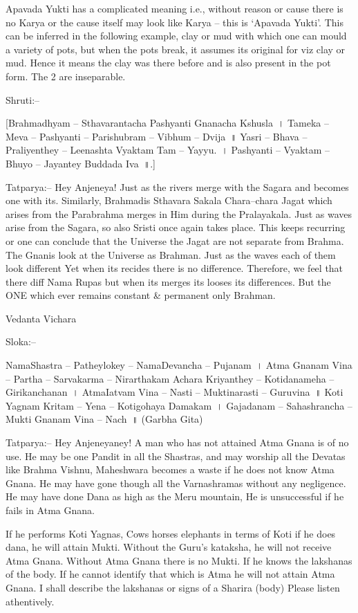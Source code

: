 Apavada Yukti has a complicated meaning i.e., without reason or cause there is no Karya or the cause itself may look like Karya – this is ‘Apavada Yukti’. This can be inferred in the following example, clay or mud with which one can mould a variety of pots, but when the pots break, it assumes its original for viz clay or mud. Hence it means the clay was there before and is also present in the pot form. The 2 are inseparable.

Shruti:–

[Brahmadhyam – Sthavarantacha Pashyanti Gnanacha Kshusla~। Tameka – Meva – Pashyanti – Parishubram – Vibhum – Dvija~॥ Yasri – Bhava – Praliyenthey – Leenashta Vyaktam Tam – Yayyu.~। Pashyanti – Vyaktam – Bhuyo – Jayantey Buddada Iva~॥.]

Tatparya:– Hey Anjeneya! Just as the rivers merge with the Sagara and becomes one with its. Similarly, Brahmadis Sthavara Sakala Chara–chara Jagat which arises from the Parabrahma merges in Him during the Pralayakala. Just as waves arise from the Sagara, so also Sristi once again takes place. This keeps recurring or one can conclude that the Universe the Jagat are not separate from Brahma. The Gnanis look at the Universe as Brahman. Just as the waves each of them look different Yet when its recides there is no difference. Therefore, we feel that there diff Nama Rupas but when its merges its looses its differences. But the ONE which ever remains constant \& permanent only Brahman.

Vedanta Vichara

Sloka:–

NamaShastra – Patheylokey – NamaDevancha – Pujanam~। Atma Gnanam Vina – Partha – Sarvakarma – Nirarthakam Achara Kriyanthey – Kotidanameha – Girikanchanan~। AtmaIatvam Vina – Nasti – Muktinarasti – Guruvina~॥ Koti Yagnam Kritam – Yena – Kotigohaya Damakam~। Gajadanam – Sahashrancha – Mukti Gnanam Vina – Nach~॥ (Garbha Gita)

Tatparya:– Hey Anjeneyaney! A man who has not attained Atma Gnana is of no use. He may be one Pandit in all the Shastras, and may worship all the Devatas like Brahma Vishnu, Maheshwara becomes a waste if he does not know Atma Gnana. He may have gone though all the Varnashramas without any negligence. He may have done Dana as high as the Meru mountain, He is unsuccessful if he fails in Atma Gnana.

If he performs Koti Yagnas, Cows horses elephants in terms of Koti if he does dana, he will attain Mukti. Without the Guru's kataksha, he will not receive Atma Gnana. Without Atma Gnana there is no Mukti. If he knows the lakshanas of the body. If he cannot identify that which is Atma he will not attain Atma Gnana. I shall describe the lakshanas or signs of a Sharira (body) Please listen athentively.

